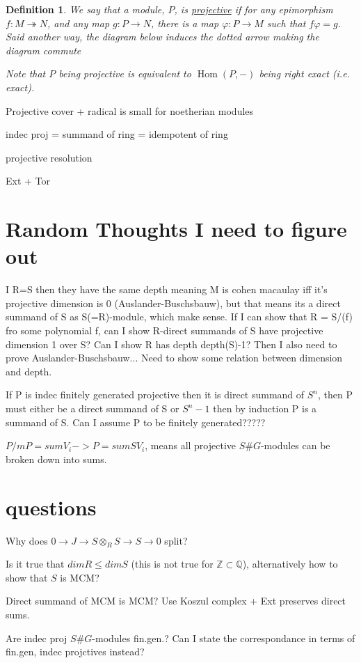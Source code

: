 \documentclass[11pt, a4paper, english]{article}
\numberwithin{prop}{section}
\numberwithin{lemma}{section}
\numberwithin{theorem}{section}
\newtheorem{defin}{Definition}
\numberwithin{defin}{section}
\numberwithin{example}{section}
\DeclareMathOperator{\Hom}{Hom}
\begin{document}
\begin{appendices}
\begin{defin}
We say that a module, $P$, is \underline{projective} if for any epimorphism $f: M \twoheadrightarrow N$, and any map $g: P \to N$, there is a map $\varphi: P \to M$ such that $f \varphi = g$. Said another way, the diagram below induces the dotted arrow making the diagram commute
\begin{center}
\end{center} 
Note that $P$ being projective is equivalent to $\Hom(P, -)$ being right exact (i.e. exact).
\end{defin}

Projective cover + radical is  small for noetherian modules

indec proj = summand of ring = idempotent of ring

projective resolution

Ext + Tor
\end{appendices}

\section{Random Thoughts I need to figure out}
I R=S then they have the same depth meaning M is cohen macaulay iff it's projective dimension is 0 (Auslander-Buschsbauw), but that means its a direct summand of S as S(=R)-module, which make sense. If I can show that R = S/(f) fro some polynomial f, can I show R-direct summands of S have projective dimension 1 over S? Can I show R has depth depth(S)-1? Then I also need to prove Auslander-Buschsbauw... Need to show some relation between dimension and depth.

If P is indec finitely generated projective then it is direct summand of $S^n$, then P must either be a direct summand of S or $S^n-1$ then by induction P is a  summand of S. Can I assume P to be finitely generated?????

$P/mP = sum V_i -> P = sum SV_i$, means  all projective $S\#G$-modules can be broken down into sums.

\section{questions}
Why does $0 \to J \to S \otimes_R S \to S \to 0$ split?

Is it true that $dim R \leq dim S$ (this is not true for $\mathbb{Z} \subset \mathbb{Q}$), alternatively how to show that $S$ is MCM?

Direct summand of MCM is MCM?  Use Koszul complex + Ext preserves direct sums.

Are indec proj $S\#G$-modules fin.gen.? Can I state the correspondance in terms of fin.gen, indec projctives instead?

\nocite{*}


\end{document}
